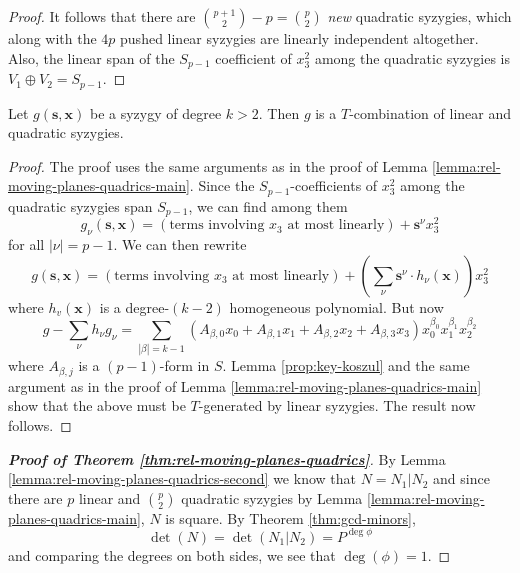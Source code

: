 \documentclass[fleqn,reqno]{amsart}
\begin{document}
\begin{proof}
	It follows that there are $\binom{p+1}{2}-p=\binom{p}{2}$ {\em new} quadratic syzygies,
	which along with the $4p$ pushed linear syzygies are linearly independent altogether.
	Also, the linear span of the $S_{p-1}$ coefficient of $x_3^2$ among the quadratic syzygies
	is $V_1\oplus V_2=S_{p-1}$.
\end{proof}

\begin{lemma}
	\label{lemma:rel-moving-planes-quadrics-second}
	Let $g(\mathbf s, \mathbf x)$ be a syzygy of degree $k>2$.
	Then $g$ is a $T$-combination of linear and quadratic syzygies.
\end{lemma}

\begin{proof}
	The proof uses the same arguments as in the proof of Lemma \ref{lemma:rel-moving-planes-quadrics-main}.
	Since the $S_{p-1}$-coefficients of $x_3^2$ among the quadratic syzygies span $S_{p-1}$,
	we can find among them
	\[
		g_\nu(\mathbf s,\mathbf x)=(\text{terms involving $x_3$ at most linearly})+{\mathbf s}^\nu x_3^2
	\]
	for all $|\nu|=p-1$. We can then rewrite
	\[
		g(\mathbf s,\mathbf x)=(\text{terms involving $x_3$ at most linearly})+(\sum_\nu {\mathbf s}^\nu\cdot h_\nu(\mathbf x))x_3^2
	\]
	where $h_v(\mathbf x)$ is a degree-$(k-2)$ homogeneous polynomial. But now
	\[
		g-\sum_\nu h_\nu g_\nu=\sum_{|\beta|=k-1} (A_{\beta,0}x_0+A_{\beta,1}x_1+A_{\beta,2}x_2+A_{\beta,3}x_3) x_0^{\beta_0}x_1^{\beta_1}x_2^{\beta_2}
	\]
	where $A_{\beta,j}$ is a $(p-1)$-form in $S$.
	Lemma \ref{prop:key-koszul} and the same argument as in the proof of Lemma \ref{lemma:rel-moving-planes-quadrics-main}
	show that the above must be $T$-generated by linear syzygies.
	The result now follows.
\end{proof}

\begin{proof}[\bf Proof of Theorem \ref{thm:rel-moving-planes-quadrics}]
	By Lemma \ref{lemma:rel-moving-planes-quadrics-second} we know that $N=N_1|N_2$
	and since there are $p$ linear and $\binom{p}{2}$ quadratic syzygies
	by Lemma \ref{lemma:rel-moving-planes-quadrics-main}, $N$ is square.
	By Theorem \ref{thm:gcd-minors},
	\[
		\det(N)=\det(N_1|N_2)=P^{\deg\phi}
	\]
	and comparing the degrees on both sides, we see that $\deg(\phi)=1$.
\end{proof}




\end{document}
